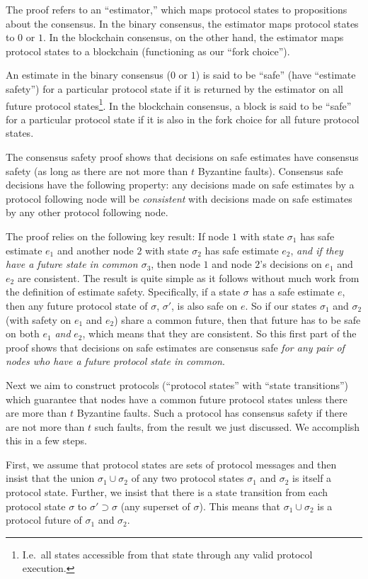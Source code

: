 \documentclass{article}
\theoremstyle{definition}
\begin{document}
The proof refers to an ``estimator,'' which maps protocol states to propositions about the consensus. In the binary consensus, the estimator maps protocol states to $0$ or $1$. In the blockchain consensus, on the other hand, the estimator maps protocol states to a blockchain (functioning as our ``fork choice'').

An estimate in the binary consensus ($0$ or $1$) is said to be ``safe'' (have ``estimate safety'') for a particular protocol state if it is returned by the estimator on all future protocol states\footnote{I.e.\ all states accessible from that state through any valid protocol execution.}. In the blockchain consensus, a block is said to be ``safe'' for a particular protocol state if it is also in the fork choice for all future protocol states.

The consensus safety proof shows that decisions on safe estimates have consensus safety (as long as there are not more than $t$ Byzantine faults). Consensus safe decisions have the following property: any decisions made on safe estimates by a protocol following node will be \emph{consistent} with decisions made on safe estimates by any other protocol following node.

The proof relies on the following key result: If node $1$ with state $\sigma_1$ has safe estimate $e_1$ and another node $2$ with state $\sigma_2$ has safe estimate $e_2$, \emph{and if they have a future state in common $\sigma_3$}, then node $1$ and node $2$'s decisions on $e_1$ and $e_2$ are consistent. The result is quite simple as it follows without much work from the definition of estimate safety. Specifically, if a state $\sigma$ has a safe estimate $e$, then any future protocol state of $\sigma$, $\sigma'$, is also safe on $e$. So if our states $\sigma_1$ and $\sigma_2$ (with safety on $e_1$ and $e_2$) share a common future, then that future has to be safe on both $e_1$ \emph{and} $e_2$, which means that they are consistent. So this first part of the proof shows that decisions on safe estimates are consensus safe \emph{for any pair of nodes who have a future protocol state in common}.

Next we aim to construct protocols (``protocol states'' with ``state transitions'') which guarantee that nodes have a common future protocol states unless there are more than $t$ Byzantine faults. Such a protocol has consensus safety if there are not more than $t$ such faults, from the result we just discussed. We accomplish this in a few steps.

First, we assume that protocol states are sets of protocol messages and then insist that the union $\sigma_1 \cup \sigma_2$ of any two protocol states $\sigma_1$ and $\sigma_2$ is itself a protocol state. Further, we insist that there is a state transition from each protocol state $\sigma$ to $\sigma' \supset \sigma$ (any superset of $\sigma$). This means that $\sigma_1 \cup \sigma_2$ is a protocol future of $\sigma_1$ and $\sigma_2$.
\end{document}
